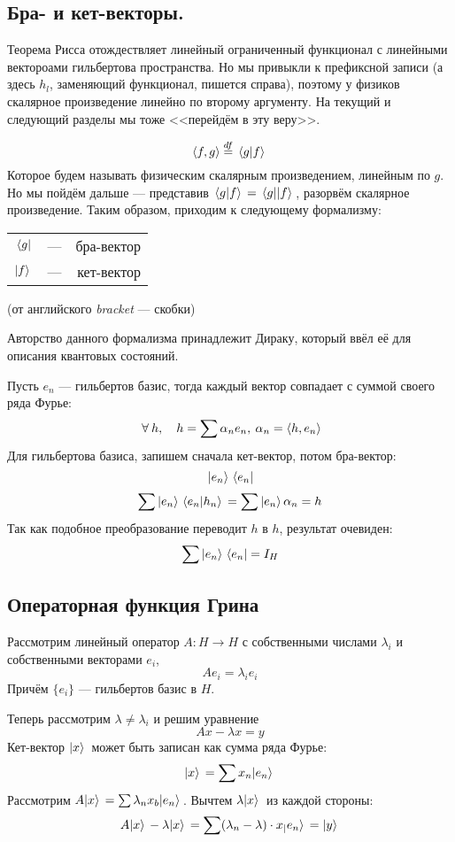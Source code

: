 \documentclass[12pt]{article}
\begin{document}
	\subsection{Бра- и кет-векторы.}
	Теорема Рисса отождествляет линейный ограниченный функционал с линейными вектороами гильбертова пространства.
	Но мы привыкли к префиксной записи (а здесь $h_l$, заменяющий функционал, пишется справа), поэтому у физиков
	скалярное произведение линейно по второму аргументу. На текущий и следующий разделы мы тоже <<перейдём в эту веру>>.
	
	$$\left\langle f, g \right\rangle \overset{df}{=} \, \langle g | f \rangle \,$$
	Которое будем называть физическим скалярным произведением, линейным по $g$. Но мы пойдём дальше --- представив
	$\, \langle g | f \rangle \, = \, \langle g | | f \rangle \,$, разорвём скалярное произведение. Таким образом, приходим к следующему формализму: \\
	\begin{tabular}{l c r}
		$\, \langle g |$ & --- & бра-вектор \\
		$| f \rangle \,$ & --- & кет-вектор \\
	\end{tabular}
	(от английского \textit{bracket} --- скобки)
	
	Авторство данного формализма принадлежит Дираку, который ввёл её для описания квантовых состояний.
	
	Пусть $e_n$ --- гильбертов базис, тогда каждый вектор совпадает с суммой своего ряда Фурье:
	$$ \forall h,\quad h = \sum \alpha_n e_n,\: \alpha_n = \scal{h}{e_n} $$
	Для гильбертова базиса, запишем сначала кет-вектор, потом бра-вектор:
	$$ | e_n \rangle \, \, \langle e_n | $$
	$$ \sum | e_n \rangle \, \, \langle e_n | h_n \rangle \, = \sum | e_n \rangle \, \alpha_n = h $$
	Так как подобное преобразование переводит $h$ в $h$, результат очевиден:
	$$ \sum | e_n \rangle \, \, \langle e_n | = I_H $$
	
	\subsection{Операторная функция Грина}
	
	Рассмотрим линейный оператор $A : H \rightarrow H$ с собственными числами $\lambda_i$ и собственными векторами $e_i$,
	$$A e_i = \lambda_i e_i$$
	Причём $\{e_i\}$ --- гильбертов базис в $H$.
	
	Теперь рассмотрим $\lambda \neq \lambda_i$ и решим уравнение
	$$ Ax - \lambda x = y $$
	Кет-вектор $| x \rangle \,$ может быть записан как сумма ряда Фурье:
	$$ | x \rangle \, = \sum x_n | e_n \rangle \, $$
	Рассмотрим $A | x \rangle \, = \sum \lambda_n x_b | e_n \rangle \,$. Вычтем $\lambda | x \rangle \,$ из каждой стороны:
	\begin{equation} \label{ketEq}
		A| x \rangle \, - \lambda| x \rangle \, = \sum (\lambda_n - \lambda) \cdot x_ | e_n \rangle \, = | y \rangle \,
	\end{equation}
	
\end{document}

